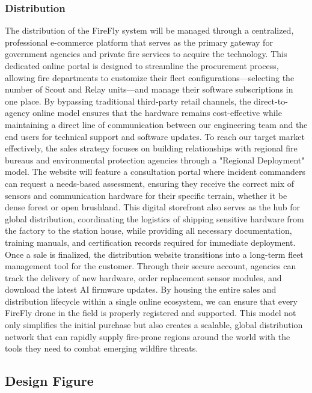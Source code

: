 \documentclass[journal, onecolumn]{IEEEtran}
\begin{document}
\subsubsection{Distribution}
The distribution of the FireFly system will be managed through a centralized, professional e-commerce platform that serves as the primary gateway for government agencies and private fire services to acquire the technology. This dedicated online portal is designed to streamline the procurement process, allowing fire departments to customize their fleet configurations—selecting the number of Scout and Relay units—and manage their software subscriptions in one place. By bypassing traditional third-party retail channels, the direct-to-agency online model ensures that the hardware remains cost-effective while maintaining a direct line of communication between our engineering team and the end users for technical support and software updates.
To reach our target market effectively, the sales strategy focuses on building relationships with regional fire bureaus and environmental protection agencies through a "Regional Deployment" model. The website will feature a consultation portal where incident commanders can request a needs-based assessment, ensuring they receive the correct mix of sensors and communication hardware for their specific terrain, whether it be dense forest or open brushland. This digital storefront also serves as the hub for global distribution, coordinating the logistics of shipping sensitive hardware from the factory to the station house, while providing all necessary documentation, training manuals, and certification records required for immediate deployment.
Once a sale is finalized, the distribution website transitions into a long-term fleet management tool for the customer. Through their secure account, agencies can track the delivery of new hardware, order replacement sensor modules, and download the latest AI firmware updates. By housing the entire sales and distribution lifecycle within a single online ecosystem, we can ensure that every FireFly drone in the field is properly registered and supported. This model not only simplifies the initial purchase but also creates a scalable, global distribution network that can rapidly supply fire-prone regions around the world with the tools they need to combat emerging wildfire threats.


\subsection{Design Figure}
\end{document}
